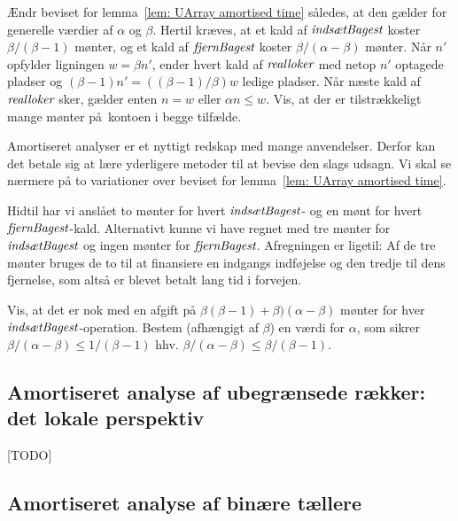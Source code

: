 \begin{exerc}\label{exerc: alpha beta costs}
  Ændr beviset for lemma~\ref{lem: UArray amortised time} således, at den gælder for generelle værdier af $\alpha$ og $\beta$.
  Hertil kræves, at et kald af $\operatorname{\emph{indsætBagest}}$ koster $\beta/(\beta-1)$ mønter, og et kald af $\operatorname{\emph{fjernBagest}}$ koster $\beta/(\alpha-\beta)$ mønter.
  Når $n'$ opfylder ligningen $w=\beta n'$, ender hvert kald af $\operatorname{\emph{realloker}}$ med netop $n'$ optagede pladser og $(\beta-1)n' = ((\beta-1)/\beta)w$ ledige pladser.
  Når næste kald af $\operatorname{\emph{realloker}}$ sker, gælder enten $n=w$ eller $\alpha n\leq w$.
  Vis, at der er tilstrækkeligt mange mønter på kontoen i begge tilfælde.
\end{exerc}

Amortiseret analyser er et nyttigt redskap med mange anvendelser.
Derfor kan det betale sig at lære yderligere metoder til at bevise den slags udsagn.
Vi skal se nærmere på to variationer over beviset for lemma~\ref{lem: UArray amortised time}.

Hidtil har vi anslået to mønter for hvert $\operatorname{\emph{indsætBagest}}$- og en mønt for hvert $\operatorname{\emph{fjernBagest}}$-kald.
Alternativt kunne vi have regnet med tre mønter for $\operatorname{\emph{indsætBagest}}$ og ingen mønter for $\operatorname{\emph{fjernBagest}}$.
Afregningen er ligetil:
Af de tre mønter bruges de to til at finansiere en indgangs indføjelse og den tredje til dens fjernelse, som altså er blevet betalt lang tid i forvejen.

\begin{exerc}
  Vis, at det er nok med en afgift på $\beta(\beta-1)+\beta)(\alpha-\beta)$ mønter for hver $\operatorname{\emph{indsætBagest}}$-operation.
  Bestem (afhængigt af $\beta$) en værdi for $\alpha$, som sikrer $\beta/(\alpha-\beta)\leq 1/(\beta-1)$ hhv. $\beta/(\alpha-\beta)\leq \beta/(\beta-1)$.
\end{exerc}


\subsection{Amortiseret analyse af ubegrænsede rækker: det lokale perspektiv}

[TODO]

\subsection{Amortiseret analyse af binære tællere}

